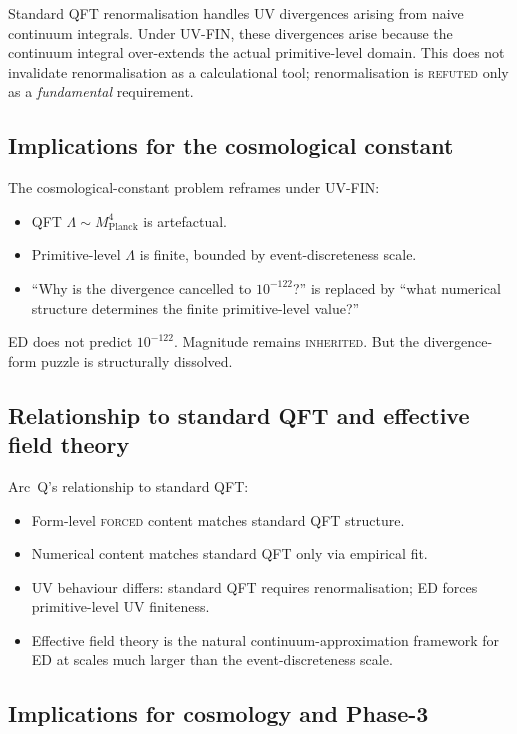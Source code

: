 \documentclass[11pt,a4paper]{article}
\begin{document}
Standard QFT renormalisation handles UV divergences arising from naive continuum integrals. Under UV-FIN, these divergences arise because the continuum integral over-extends the actual primitive-level domain. This does not invalidate renormalisation as a calculational tool; renormalisation is \textsc{refuted} only as a \emph{fundamental} requirement.

\subsection{Implications for the cosmological constant}

The cosmological-constant problem reframes under UV-FIN:
\begin{itemize}
  \item QFT $\Lambda \sim M_\mathrm{Planck}^4$ is artefactual.
  \item Primitive-level $\Lambda$ is finite, bounded by event-discreteness scale.
  \item ``Why is the divergence cancelled to $10^{-122}$?'' is replaced by ``what numerical structure determines the finite primitive-level value?''
\end{itemize}
ED does not predict $10^{-122}$. Magnitude remains \textsc{inherited}. But the divergence-form puzzle is structurally dissolved.

\subsection{Relationship to standard QFT and effective field theory}

Arc~Q's relationship to standard QFT:
\begin{itemize}
  \item Form-level \textsc{forced} content matches standard QFT structure.
  \item Numerical content matches standard QFT only via empirical fit.
  \item UV behaviour differs: standard QFT requires renormalisation; ED forces primitive-level UV finiteness.
  \item Effective field theory is the natural continuum-approximation framework for ED at scales much larger than the event-discreteness scale.
\end{itemize}

\subsection{Implications for cosmology and Phase-3}
\end{document}
